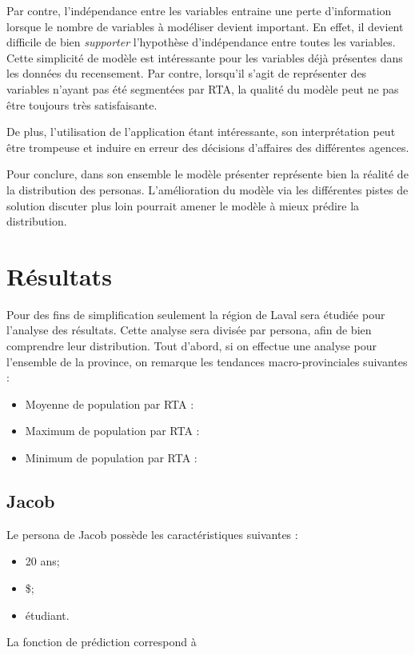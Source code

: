 \documentclass[11pt,french]{article}\usepackage[]{graphicx}\usepackage[]{color}
\begin{document}
Par contre, l'indépendance entre les variables entraine une perte d'information lorsque le nombre de variables à modéliser devient important. En effet, il devient difficile de bien \emph{supporter} l'hypothèse d'indépendance entre toutes les variables. Cette simplicité de modèle est intéressante pour les variables déjà présentes dans les données du recensement. Par contre, lorsqu'il s'agit de représenter des variables n'ayant pas été segmentées par RTA, la qualité du modèle peut ne pas être toujours très satisfaisante.
\newline

De plus, l'utilisation de l'application étant intéressante, son interprétation peut être trompeuse et induire en erreur des décisions d'affaires des différentes agences.

Pour conclure, dans son ensemble le modèle présenter représente bien la réalité de la distribution des personas. L'amélioration du modèle via les différentes pistes de solution discuter plus loin pourrait amener le modèle à mieux prédire la distribution.
 
\section{Résultats}

Pour des fins de simplification seulement la région de Laval sera étudiée pour l'analyse des résultats. Cette analyse sera divisée par persona, afin de bien comprendre leur distribution.
Tout d'abord, si on effectue une analyse pour l'ensemble de la province, on remarque les tendances macro-provinciales suivantes : 
\bigskip

\begin{itemize}
\item Moyenne de population par RTA : 
\item Maximum de population par RTA : 
\item Minimum de population par RTA : 
\end{itemize}


\subsection{Jacob}
Le persona de Jacob possède les caractéristiques suivantes : 
\begin{itemize}
\item 20 ans;
\item{} \$;
\item étudiant.
\end{itemize}
La fonction de prédiction correspond à
\end{document}
